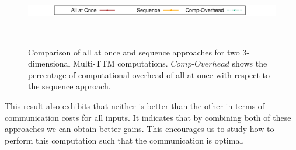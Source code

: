 \documentclass[a4paper,11pt]{article}
\begin{document}
	
	\begin{figure}[htb]
		\vspace*{-0.25cm}\begin{center}
			\includegraphics[scale=0.215]{./plots/all-at-once-seq-label.png}
		\end{center}
		\vspace*{-1.05cm}\begin{center}
			$\quad$
			\vspace*{-0.135cm}\caption{Comparison of all at once and sequence approaches for two 3-dimensional Multi-TTM computations. $Comp$-$Overhead$ shows the percentage of computational overhead of all at once with respect to the sequence approach.\label{fig:compAllatonceInseq}}
		\end{center}\vspace*{-0.475cm}		
	\end{figure}

	This result also exhibits that neither is better than the other in terms of communication costs for all inputs. It indicates that by combining both of these approaches we can obtain better gains. This encourages us to study how to perform this computation such that the communication is optimal. 
	
\end{document}
